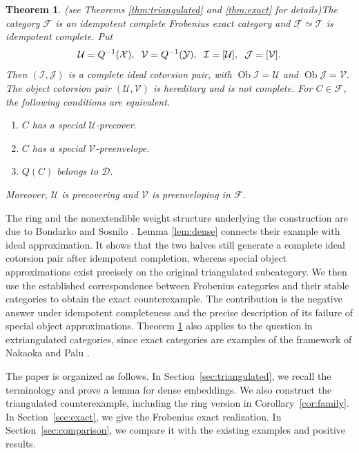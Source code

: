 \documentclass[11pt,a4paper,reqno]{amsart}
\newcommand{\Dcal}{\mathcal D}
\newcommand{\Ical}{\mathcal I}
\newcommand{\Tcal}{\mathcal T}
\newcommand{\Xcal}{\mathcal X}
\theoremstyle{plain}
\newtheorem{theorem}{Theorem}[section]
\theoremstyle{definition}
\theoremstyle{remark}
\newcommand{\Fcal}{\mathcal F}
\newcommand{\Jcal}{\mathcal J}
\newcommand{\Ycal}{\mathcal Y}
\newcommand{\Ucal}{\mathcal U}
\newcommand{\Vcal}{\mathcal V}
\newcommand{\Ob}{\operatorname{Ob}}
\begin{document}
\begin{theorem}{\rm (see Theorems \ref{thm:triangulated} and \ref{thm:exact} for details)}\label{thm:main}
The category $\Fcal$ is an idempotent complete Frobenius exact category and $\underline{\Fcal}\simeq\Tcal$ is idempotent complete. Put
$$
\Ucal=Q^{-1}(\Xcal),\hspace{2mm}
\Vcal=Q^{-1}(\Ycal),\hspace{2mm}
\Ical=[\Ucal],\hspace{2mm}
\Jcal=[\Vcal].
$$
Then $(\Ical,\Jcal)$ is a complete ideal cotorsion pair, with $\Ob\Ical=\Ucal$ and $\Ob\Jcal=\Vcal$. The object cotorsion pair $(\Ucal,\Vcal)$ is hereditary and is not complete. For $C\in\Fcal$, the following conditions are equivalent.
\begin{enumerate}
\item $C$ has a special $\Ucal$-precover.
\item $C$ has a special $\Vcal$-preenvelope.
\item $Q(C)$ belongs to $\Dcal$.
\end{enumerate}
Moreover, $\Ucal$ is precovering and $\Vcal$ is preenveloping in $\Fcal$.
\end{theorem}

The ring and the nonextendible weight structure underlying the construction are due to Bondarko and Sosnilo \cite[Section~3.1]{BS18}. Lemma \ref{lem:dense} connects their example with ideal approximation. It shows that the two halves still generate a complete ideal cotorsion pair after idempotent completion, whereas special object approximations exist precisely on the original triangulated subcategory. We then use the established correspondence between Frobenius categories and their stable categories to obtain the exact counterexample. The contribution is the negative answer under idempotent completeness and the precise description of its failure of special object approximations.
Theorem \ref{thm:main} also applies to the question in extriangulated categories, since exact categories are examples of the framework of Nakaoka and Palu \cite{NP19}. 

The paper is organized as follows. In Section~\ref{sec:triangulated}, we recall the terminology and prove a lemma for dense embeddings. We also construct the triangulated counterexample, including the ring version in Corollary~\ref{cor:family}. In Section~\ref{sec:exact}, we give the Frobenius exact realization. In Section~\ref{sec:comparison}, we compare it with the existing examples and positive results.
\end{document}
